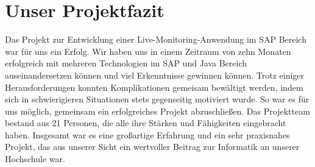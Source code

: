 \section*{Unser Projektfazit}
Das Projekt zur Entwicklung einer Live-Monitoring-Anwendung im SAP Bereich war für uns ein Erfolg. Wir haben uns in einem Zeitraum von zehn Monaten erfolgreich mit mehreren Technologien im SAP und Java Bereich auseinandersetzen können und viel Erkenntnisse gewinnen können.
\newline
\newline
Trotz einiger Herausforderungen konnten Komplikationen gemeisam bewältigt werden, indem sich in schwierigieren Situationen stets gegenseitig motiviert wurde. So war es für uns möglich, gemeinsam ein erfolgreiches Projekt abzuschließen.
\newline
\newline
Das Projektteam bestand aus 21 Personen, die alle ihre Stärken und Fähigkeiten eingebracht haben. Insgesamt war es eine großartige Erfahrung und ein sehr praxisnahes Projekt, das aus unserer Sicht ein wertvoller Beitrag zur Informatik an unserer Hochschule war.
